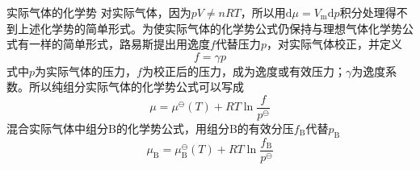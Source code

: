 \begin{frame}{实际气体的化学势}
    对实际气体，因为$pV\neq nRT$，所以用$\mathrm{d} \mu=V_{\mathrm{m}} \mathrm{d} p$积分处理得不到上述化学势的简单形式。为使实际气体的化学势公式仍保持与理想气体化学势公式有一样的简单形式，路易斯提出用逸度$f$代替压力$p$，对实际气体校正，并定义
    $$f=\gamma p$$
    式中$p$为实际气体的压力，$f$为校正后的压力，成为逸度或有效压力；$\gamma$为逸度系数。所以纯组分实际气体的化学势公式可以写成
    \vspace{-2pt}
    $$\mu = \mu^\ominus (T) + RT\ln \frac{f}{p^\ominus}$$
    混合实际气体中组分B的化学势公式，用组分B的有效分压$f_\mathrm{B}$代替$p_\mathrm{B}$
    \vspace{-2pt}
    $$\mu_\mathrm{B} = \mu_\mathrm{B}^\ominus (T) + RT\ln \frac{f_\mathrm{B}}{p^\ominus}$$    
\end{frame}
